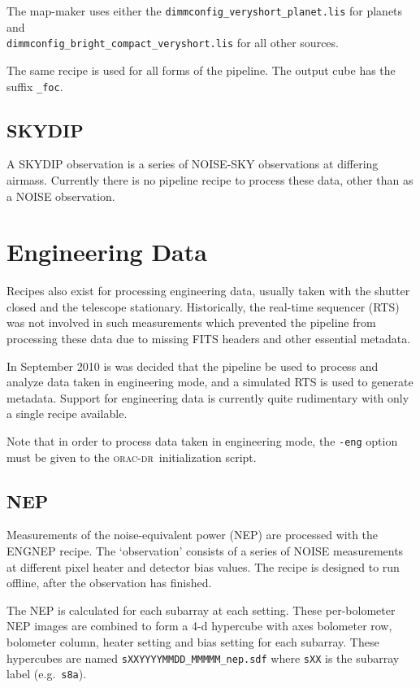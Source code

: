 \documentclass[twoside,11pt]{article}
\newcommand{\xlabel}[1]{}
\renewcommand{\_}{\texttt{\symbol{95}}}
\newcommand{\oracdr}{\textsc{orac-dr}}
\newcommand{\task}[1]{\textsf{#1}}
\begin{document}
The map-maker uses either the \verb+dimmconfig_veryshort_planet.lis+
for planets and \\ \verb+dimmconfig_bright_compact_veryshort.lis+ for
all other sources.

The same recipe is used for all forms of the pipeline. The output cube
has the suffix \verb+_foc+.

\subsection{SKYDIP}

A SKYDIP observation is a series of NOISE-SKY observations at
differing airmass. Currently there is no pipeline recipe to process
these data, other than as a NOISE observation.


\section{\xlabel{engineering}Engineering Data\label{se:eng}}

Recipes also exist for processing engineering data, usually taken with
the shutter closed and the telescope stationary. Historically, the
real-time sequencer (RTS) was not involved in such measurements which
prevented the pipeline from processing these data due to missing FITS
headers and other essential metadata.

In September 2010 is was decided that the pipeline be used to process
and analyze data taken in engineering mode, and a simulated RTS is
used to generate metadata. Support for engineering data is currently
quite rudimentary with only a single recipe available.

Note that in order to process data taken in engineering mode, the
\verb+-eng+ option must be given to the \oracdr\ initialization
script.

\subsection{NEP}

Measurements of the noise-equivalent power (NEP) are processed with
the \task{ENG\_NEP} recipe. The `observation' consists of a series of
NOISE measurements at different pixel heater and detector bias
values. The recipe is designed to run offline, after the observation
has finished.

The NEP is calculated for each subarray at each setting. These
per-bolometer NEP images are combined to form a 4-d hypercube with
axes bolometer row, bolometer column, heater setting and bias setting
for each subarray. These hypercubes are named
\verb+sXXYYYYMMDD_MMMMM_nep.sdf+ where \verb+sXX+ is the subarray
label (e.g.\ \verb+s8a+).
\end{document}
